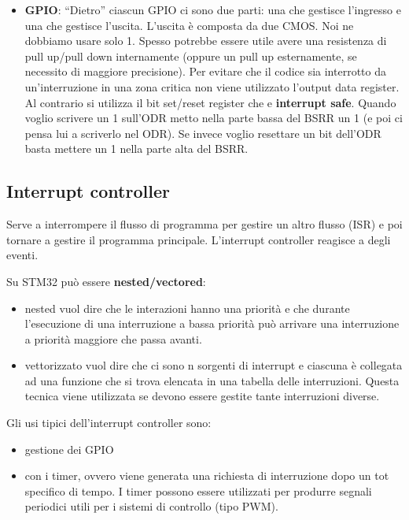 \documentclass[
]{book}
\providecommand{\tightlist}{%
  \setlength{\itemsep}{0pt}\setlength{\parskip}{0pt}}
\begin{document}
\begin{itemize}
\tightlist
\item
  \textbf{GPIO}: ``Dietro'' ciascun GPIO ci sono due parti: una che
  gestisce l'ingresso e una che gestisce l'uscita. \newline L'uscita è
  composta da due CMOS. Noi ne dobbiamo usare solo 1. Spesso potrebbe
  essere utile avere una resistenza di pull up/pull down internamente
  (oppure un pull up esternamente, se necessito di maggiore precisione).
  Per evitare che il codice sia interrotto da un'interruzione in una
  zona critica non viene utilizzato l'output data register. \newline Al
  contrario si utilizza il bit set/reset register che e
  \textbf{interrupt safe}. \newline Quando voglio scrivere un 1 sull'ODR
  metto nella parte bassa del BSRR un 1 (e poi ci pensa lui a scriverlo
  nel ODR). Se invece voglio resettare un bit dell'ODR basta mettere un
  1 nella parte alta del BSRR.
\end{itemize}

\subsection{Interrupt controller}\label{interrupt-controller}

Serve a interrompere il flusso di programma per gestire un altro flusso
(ISR) e poi tornare a gestire il programma principale. L'interrupt
controller reagisce a degli eventi.

Su STM32 può essere \textbf{nested/vectored}:

\begin{itemize}
\tightlist
\item
  nested vuol dire che le interazioni hanno una priorità e che durante
  l'esecuzione di una interruzione a bassa priorità può arrivare una
  interruzione a priorità maggiore che passa avanti.\\
\item
  vettorizzato vuol dire che ci sono n sorgenti di interrupt e ciascuna
  è collegata ad una funzione che si trova elencata in una tabella delle
  interruzioni. Questa tecnica viene utilizzata se devono essere gestite
  tante interruzioni diverse.
\end{itemize}

Gli usi tipici dell'interrupt controller sono:

\begin{itemize}
\tightlist
\item
  gestione dei GPIO
\item
  con i timer, ovvero viene generata una richiesta di interruzione dopo
  un tot specifico di tempo. I timer possono essere utilizzati per
  produrre segnali periodici utili per i sistemi di controllo (tipo
  PWM).
\end{itemize}
\end{document}
